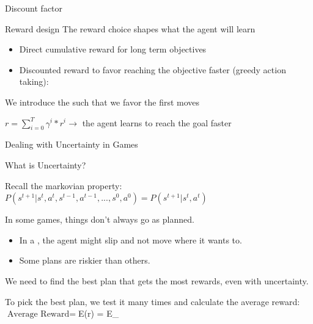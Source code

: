 \documentclass[aspectratio=169,xcolor=dvipsnames]{beamer}
\begin{document}

\begin{frame}{Discount factor}

\begin{block}{Reward design}    
    The reward choice shapes what the agent will learn
    \vspace{10pt}
    \begin{itemize}
        \item Direct cumulative reward for long term objectives
        \item Discounted reward to favor reaching the objective faster (greedy action taking):
    \end{itemize}
        \vspace{10pt}
        We introduce the  such that we favor the first moves
        \vspace{10pt}
\end{block}
        
\centering
$ r = \displaystyle \sum_{i=0}^T \gamma^i * r^i \to $ the agent learns to reach the goal faster 


\end{frame}


\begin{frame}{Dealing with Uncertainty in Games}

    \begin{block}{What is Uncertainty?}
    
        Recall the markovian property: $P(s^{t+1} | s^t, a^t, s^{t-1}, a^{t-1}, ..., s^0, a^0) = P(s^{t+1} | s^t, a^t)$
    
        \vspace{10pt}
        In some games, things don’t always go as planned.  
        \vspace{10pt}
        \begin{itemize}
            \item In a , the agent might slip and not move where it wants to.
            \item Some plans are riskier than others.
        \end{itemize}
        \vspace{10pt}
        We need to find the best plan that gets the most rewards, even with uncertainty.  
        \vspace{10pt}
    \end{block}
    
    \centering
    To pick the best plan, we test it many times and calculate the average reward: \\
    $ \text{Average Reward} = $E(r) = E_{\pi} \left[\displaystyle\sum_{i=0}^T \gamma^i \times r^i\right]

\end{frame}
\end{document}
